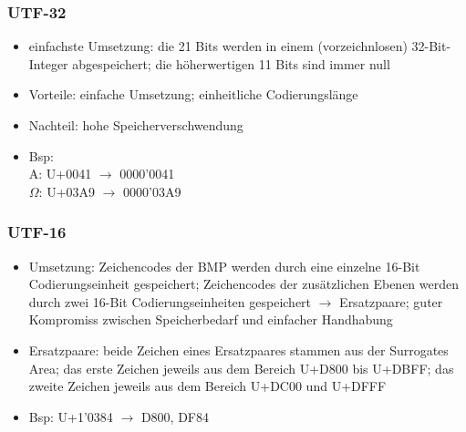 \documentclass[a4paper,10pt]{article}
\begin{document}
\subsubsection{UTF-32}
\begin{itemize}
\item einfachste Umsetzung: die 21 Bits werden in einem (vorzeichnlosen) 32-Bit-Integer abgespeichert; die h\"oherwertigen 11 Bits sind immer null
\item Vorteile: einfache Umsetzung; einheitliche Codierungsl\"ange
\item Nachteil: hohe Speicherverschwendung
\item Bsp: \\ A: U+0041 $\to$ 0000'0041 \\ $\Omega$: U+03A9 $\to$ 0000'03A9
\end{itemize}

\subsubsection{UTF-16}
\begin{itemize}
\item Umsetzung: Zeichencodes der BMP werden durch eine einzelne 16-Bit Codierungseinheit gespeichert; Zeichencodes der zus\"atzlichen Ebenen werden durch zwei 16-Bit Codierungseinheiten gespeichert $\to$ Ersatzpaare; guter Kompromiss zwischen Speicherbedarf und einfacher Handhabung
\item Ersatzpaare: beide Zeichen eines Ersatzpaares stammen aus der Surrogates Area; das erste Zeichen jeweils aus dem Bereich U+D800 bis U+DBFF; das zweite Zeichen jeweils aus dem Bereich U+DC00 und U+DFFF
\item Bsp: U+1'0384 $\to$ D800, DF84
\end{itemize}
\end{document}
